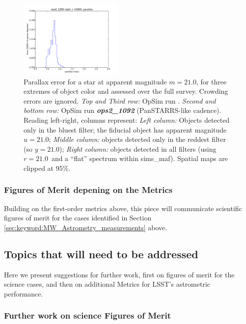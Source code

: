 \begin{figure}[ht]
\begin{center}
  \includegraphics[width=2.0in]{./figs/milkyway/MW_Astrom_paError_1092_10y_hst.pdf}
  \end{center}
  \caption{Parallax error for a star at apparent magnitude $m=21.0$, for three extremes of object color and assessed over the full survey. Crowding errors are ignored. {\it Top and Third row:} OpSim run . {\it Second and bottom row:} OpSim run {\it \bf ops2\_1092} (PanSTARRS-like cadence). Reading left-right, columns represent: {\it Left column:} Objects detected only in the bluest filter; the fiducial object has apparent magnitude $u=21.0$; {\it Middle column:} objects detected only in the reddest filter (so $y = 21.0$); {\it Right column:} objects detected in all filters (using $r=21.0$~and a ``flat'' spectrum within sims\_maf). Spatial maps are clipped at 95\%.}
  \label{fig_astrom_ByFilter_paError}
\end{figure}

\subsubsection{Figures of Merit depening on the Metrics}

Building on the first-order metrics above, this piece will communicate scientific figures of merit for the cases identified in Section \ref{sec:keyword:MW_Astrometry_measurements} above.

\subsection{Topics that will need to be addressed}
\label{sec:keyword:MW_Astrometry_furtherwork}

Here we present suggestions for further work, first on figures of
merit for the science cases, and then on additional Metrics for LSST's
astrometric performance.

\subsubsection{Further work on science Figures of Merit}


